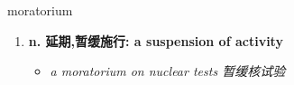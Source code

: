 
\begin{frame}
{\huge moratorium}
\begin{center}
\begin{enumerate}\Large
  \item \textbf{n. 延期,暂缓施行: a suspension of activity}
  \begin{itemize}
    \item \em{\Large{a moratorium on nuclear tests 暂缓核试验}}
  \end{itemize}
\end{enumerate}
\end{center}
\end{frame}
